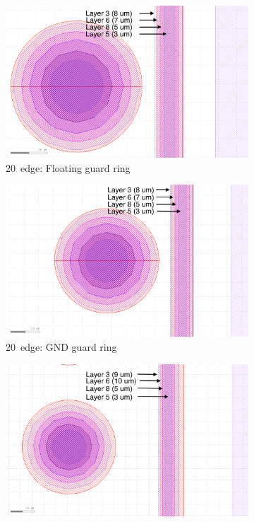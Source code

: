 \begin{figure}[htbp]
  \centering
  \begin{subfigure}[b]{0.33\textwidth}
    \centering
    \includegraphics[width=\textwidth]{figures/ActiveEdge/20umEdge_float_GR_withText.png}
    \caption{20~\micron edge: Floating guard ring}
    \label{fig:GuardRingLayout_20_float_GR}
  \end{subfigure}\hfill
  \centering
  \begin{subfigure}[b]{0.33\textwidth}
    \centering
    \includegraphics[width=\textwidth]{figures/ActiveEdge/20umEdge_GND_GR_withText.png}
    \caption{20~\micron edge: GND guard ring}
    \label{fig:GuardRingLayout_20_GND_GR}
  \end{subfigure}\hfill
  \centering
  \begin{subfigure}[b]{0.33\textwidth}
    \centering
    \includegraphics[width=\textwidth]{figures/ActiveEdge/50umEdge_GND_GR_withText.png}

\end{subfigure}
\end{figure}
